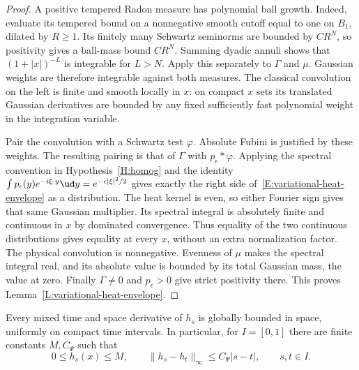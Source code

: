 \begin{proof}
  A positive tempered Radon measure has polynomial ball growth.
  Indeed, evaluate its tempered bound on a nonnegative smooth cutoff
  equal to one on $B_1$, dilated by $R\ge1$. Its finitely many
  Schwartz seminorms are bounded by $CR^N$, so positivity gives
  a ball-mass bound $CR^N$. Summing dyadic annuli shows that
  $(1+|x|)^{-L}$ is integrable for $L>N$.
  Apply this separately to $\Gamma$ and $\mu$.
  Gaussian weights are therefore integrable against both measures.
  The classical convolution on the left is finite and smooth locally
  in $x$: on compact $x$ sets its translated Gaussian derivatives
  are bounded by any fixed sufficiently fast polynomial weight in
  the integration variable.

  Pair the convolution with a Schwartz test $\varphi$.
  Absolute Fubini is justified by these weights. The resulting
  pairing is that of $\Gamma$ with $p_\epsilon*\varphi$.
  Applying the spectral convention in Hypothesis~\ref{H:homog}
  and the identity
  $\int p_\epsilon(y)e^{-i\xi\cdot y}\ud y
  =e^{-\epsilon|\xi|^2/2}$
  gives exactly the right side of~\eqref{E:variational-heat-envelope}
  as a distribution. The heat kernel is even, so either Fourier
  sign gives that same Gaussian multiplier.
  Its spectral integral is absolutely finite and continuous in $x$
  by dominated convergence. Thus equality of the two continuous
  distributions gives equality at every $x$, without an extra
  normalization factor.
  The physical convolution is nonnegative. Evenness of $\mu$ makes
  the spectral integral real, and its absolute value is bounded by
  its total Gaussian mass, the value at zero.
  Finally $\Gamma\ne0$ and $p_\epsilon>0$ give strict positivity there.
  This proves Lemma~\ref{L:variational-heat-envelope}.
\end{proof}

\begin{lemma}
  \label{L:variational-global-mean}
  Every mixed time and space derivative of $h_s$ is globally bounded
  in space, uniformly on compact time intervals. In particular, for
  $I=[0,1]$ there are finite constants $M,C_\Psi$ such that
  \begin{equation}\label{E:variational-global-mean}
    0\le h_s(x)\le M,\qquad
    \|h_s-h_t\|_\infty\le C_\Psi|s-t|,
    \qquad s,t\in I.
  \end{equation}
\end{lemma}

